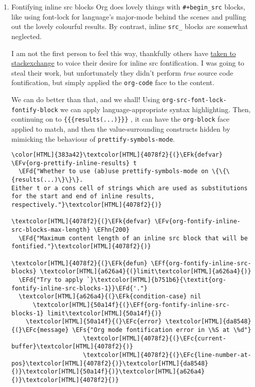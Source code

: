 \documentclass{scrartcl}
\newcommand{\EFk}[1]{\textcolor{EFk}{#1}} %
\newcommand{\EFd}[1]{\textcolor{EFd}{\textit{#1}}} %
\newcommand{\EFs}[1]{\textcolor{EFs}{#1}} %
\newcommand{\EFc}[1]{\textcolor{EFc}{#1}} %
\newcommand{\EFv}[1]{\textcolor{EFv}{#1}} %
\newcommand{\EFf}[1]{\textcolor{EFf}{#1}} %
\newcommand{\EFhn}[1]{\textcolor{EFhn}{\textbf{#1}}} %
\begin{document}
\begin{enumerate}
\item Fontifying inline src blocks
\label{sec:org6c28ee5}
Org does lovely things with \texttt{\#+begin\_src} blocks, like using font-lock for
language's major-mode behind the scenes and pulling out the lovely colourful
results. By contrast, inline \texttt{src\_} blocks are somewhat neglected.

I am not the first person to feel this way, thankfully others have \href{https://stackoverflow.com/questions/20309842/how-to-syntax-highlight-for-org-mode-inline-source-code-src-lang/28059832}{taken to
stackexchange} to voice their desire for inline src fontification. I was going to
steal their work, but unfortunately they didn't perform \emph{true} source code
fontification, but simply applied the \texttt{org-code} face to the content.

We can do better than that, and we shall! Using \texttt{org-src-font-lock-fontify-block}
we can apply language-appropriate syntax highlighting. Then, continuing on to
\texttt{\{\{\{results(...)\}\}\}} , it can have the \texttt{org-block} face applied to match, and then
the value-surrounding constructs hidden by mimicking the behaviour of
\texttt{prettify-symbols-mode}.

\begin{Code}
\begin{Verbatim}[]
\color[HTML]{383a42}\textcolor[HTML]{4078f2}{(}\EFk{defvar} \EFv{org-prettify-inline-results} t
  \EFd{"Whether to use (ab)use prettify-symbols-mode on \{\{\{results(...)\}\}\}.
Either t or a cons cell of strings which are used as substitutions
for the start and end of inline results, respectively."}\textcolor[HTML]{4078f2}{)}

\textcolor[HTML]{4078f2}{(}\EFk{defvar} \EFv{org-fontify-inline-src-blocks-max-length} \EFhn{200}
  \EFd{"Maximum content length of an inline src block that will be fontified."}\textcolor[HTML]{4078f2}{)}

\textcolor[HTML]{4078f2}{(}\EFk{defun} \EFf{org-fontify-inline-src-blocks} \textcolor[HTML]{a626a4}{(}limit\textcolor[HTML]{a626a4}{)}
  \EFd{"Try to apply `}\textcolor[HTML]{b751b6}{\textit{org-fontify-inline-src-blocks-1}}\EFd{'."}
  \textcolor[HTML]{a626a4}{(}\EFk{condition-case} nil
      \textcolor[HTML]{50a14f}{(}\EFf{org-fontify-inline-src-blocks-1} limit\textcolor[HTML]{50a14f}{)}
    \textcolor[HTML]{50a14f}{(}\EFc{error} \textcolor[HTML]{da8548}{(}\EFc{message} \EFs{"Org mode fontification error in \%S at \%d"}
                    \textcolor[HTML]{4078f2}{(}\EFc{current-buffer}\textcolor[HTML]{4078f2}{)}
                    \textcolor[HTML]{4078f2}{(}\EFc{line-number-at-pos}\textcolor[HTML]{4078f2}{)}\textcolor[HTML]{da8548}{)}\textcolor[HTML]{50a14f}{)}\textcolor[HTML]{a626a4}{)}\textcolor[HTML]{4078f2}{)}


\end{Verbatim}
\end{Code}
\end{enumerate}
\end{document}
